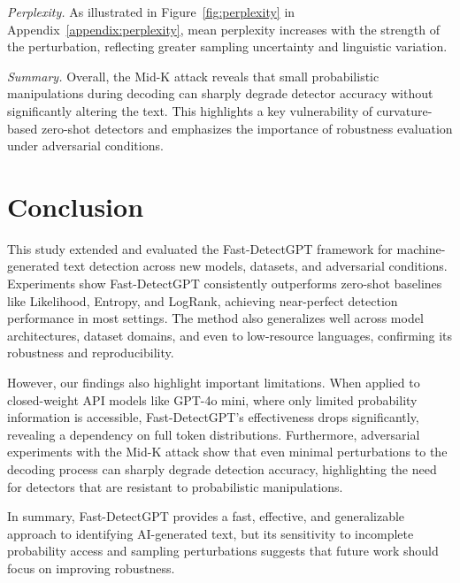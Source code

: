 \documentclass[11pt]{article}
\begin{document}
\textit{Perplexity.}  
As illustrated in Figure~\ref{fig:perplexity} in Appendix~\ref{appendix:perplexity}, mean perplexity increases with the strength of the perturbation, reflecting greater sampling uncertainty and linguistic variation.

\textit{Summary.}  
Overall, the Mid-K attack reveals that small probabilistic manipulations during decoding can sharply degrade detector accuracy without significantly altering the text. This highlights a key vulnerability of curvature-based zero-shot detectors and emphasizes the importance of robustness evaluation under adversarial conditions.

\section{Conclusion}

This study extended and evaluated the Fast-DetectGPT framework for machine-generated text detection across new models, datasets, and adversarial conditions. Experiments show Fast-DetectGPT consistently outperforms zero-shot baselines like Likelihood, Entropy, and LogRank, achieving near-perfect detection performance in most settings. The method also generalizes well across model architectures, dataset domains, and even to low-resource languages, confirming its robustness and reproducibility.

However, our findings also highlight important limitations. When applied to closed-weight API models like GPT-4o mini, where only limited probability information is accessible, Fast-DetectGPT’s effectiveness drops significantly, revealing a dependency on full token distributions. Furthermore, adversarial experiments with the Mid-K attack show that even minimal perturbations to the decoding process can sharply degrade detection accuracy, highlighting the need for detectors that are resistant to probabilistic manipulations.

In summary, Fast-DetectGPT provides a fast, effective, and generalizable approach to identifying AI-generated text, but its sensitivity to incomplete probability access and sampling perturbations suggests that future work should focus on improving robustness.


%


\newpage

\onecolumn
\end{document}
